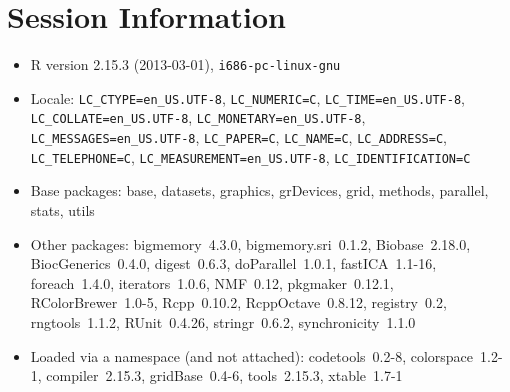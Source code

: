 \documentclass[10pt]{article}
\begin{document}
\section*{Session Information}
\begin{itemize}\raggedright
  \item R version 2.15.3 (2013-03-01), \verb|i686-pc-linux-gnu|
  \item Locale: \verb|LC_CTYPE=en_US.UTF-8|, \verb|LC_NUMERIC=C|, \verb|LC_TIME=en_US.UTF-8|, \verb|LC_COLLATE=en_US.UTF-8|, \verb|LC_MONETARY=en_US.UTF-8|, \verb|LC_MESSAGES=en_US.UTF-8|, \verb|LC_PAPER=C|, \verb|LC_NAME=C|, \verb|LC_ADDRESS=C|, \verb|LC_TELEPHONE=C|, \verb|LC_MEASUREMENT=en_US.UTF-8|, \verb|LC_IDENTIFICATION=C|
  \item Base packages: base, datasets, graphics, grDevices, grid,
    methods, parallel, stats, utils
  \item Other packages: bigmemory~4.3.0, bigmemory.sri~0.1.2,
    Biobase~2.18.0, BiocGenerics~0.4.0, digest~0.6.3, doParallel~1.0.1,
    fastICA~1.1-16, foreach~1.4.0, iterators~1.0.6, NMF~0.12,
    pkgmaker~0.12.1, RColorBrewer~1.0-5, Rcpp~0.10.2,
    RcppOctave~0.8.12, registry~0.2, rngtools~1.1.2, RUnit~0.4.26,
    stringr~0.6.2, synchronicity~1.1.0
  \item Loaded via a namespace (and not attached): codetools~0.2-8,
    colorspace~1.2-1, compiler~2.15.3, gridBase~0.4-6, tools~2.15.3,
    xtable~1.7-1
\end{itemize}
\end{document}
